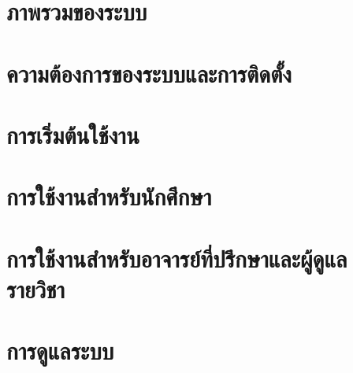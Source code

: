 \documentclass[guides]{cskkumanual}
\begin{document}
\makecover
\frontmatter

\begin{preface}

\end{preface}



\makecontents        %


\mainmatter

\chapter{ภาพรวมของระบบ}


\chapter{ความต้องการของระบบและการติดตั้ง}


\chapter{การเริ่มต้นใช้งาน}


\chapter{การใช้งานสำหรับนักศึกษา}


\chapter{การใช้งานสำหรับอาจารย์ที่ปรึกษาและผู้ดูแลรายวิชา}


\chapter{การดูแลระบบ}

\end{document}
